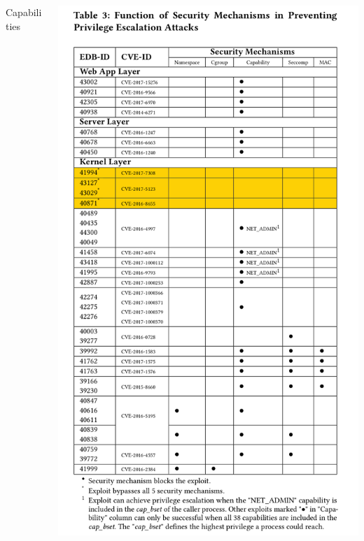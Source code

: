 \documentclass{beamer}
\begin{document}
\begin{CJK*}{UTF8}{bsmi}
    \begin{frame}
        \begin{columns}
            \begin{column}{0.5\textwidth}
                \centering
                \Large{Capabilities}
            \end{column}
            \begin{column}{0.5\textwidth}
                \begin{center}
                    \includegraphics[height=.95\textheight]{Screenshot_2021-03-24_17-04-35.png}
                \end{center}
            \end{column}
        \end{columns}
    \end{frame}


\end{CJK*}
\end{document}
